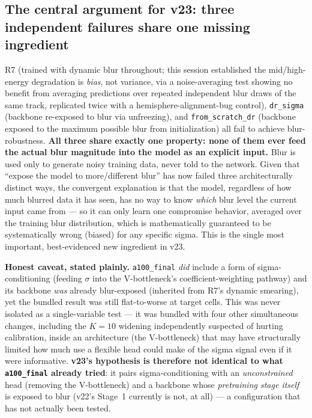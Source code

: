 \documentclass[11pt]{article}
\newcommand{\code}[1]{\texttt{#1}}
\begin{document}
\subsection{The central argument for v23: three independent failures share one missing ingredient}
\label{sec:central-argument}
R7 (trained with dynamic blur throughout; this session established the mid/high-energy
degradation is \emph{bias}, not variance, via a noise-averaging test showing no benefit from
averaging predictions over repeated independent blur draws of the same track, replicated
twice with a hemisphere-alignment-bug control), \code{dr\_sigma} (backbone re-exposed to blur
via unfreezing), and \code{from\_scratch\_dr} (backbone exposed to the maximum possible blur
from initialization) all fail to achieve blur-robustness. \textbf{All three share exactly one
property: none of them ever feed the actual blur magnitude into the model as an explicit
input.} Blur is used only to generate noisy training data, never told to the network. Given
that ``expose the model to more/different blur'' has now failed three architecturally
distinct ways, the convergent explanation is that the model, regardless of how much blurred
data it has seen, has no way to know \emph{which} blur level the current input came from ---
so it can only learn one compromise behavior, averaged over the training blur distribution,
which is mathematically guaranteed to be systematically wrong (biased) for any specific
sigma. This is the single most important, best-evidenced new ingredient in v23.

\textbf{Honest caveat, stated plainly.} \code{a100\_final} \emph{did} include a form of
sigma-conditioning (feeding $\sigma$ into the V-bottleneck's coefficient-weighting pathway)
and its backbone \emph{was} already blur-exposed (inherited from R7's dynamic smearing), yet
the bundled result was still flat-to-worse at target cells. This was never isolated as a
single-variable test --- it was bundled with four other simultaneous changes, including the
$K{=}10$ widening independently suspected of hurting calibration, inside an architecture
(the V-bottleneck) that may have structurally limited how much use a flexible head could make
of the sigma signal even if it were informative. \textbf{v23's hypothesis is therefore not
identical to what \code{a100\_final} already tried}: it pairs sigma-conditioning with an
\emph{unconstrained} head (removing the V-bottleneck) and a backbone whose \emph{pretraining
stage itself} is exposed to blur (v22's Stage~1 currently is not, at all) --- a configuration
that has not actually been tested.
\end{document}
